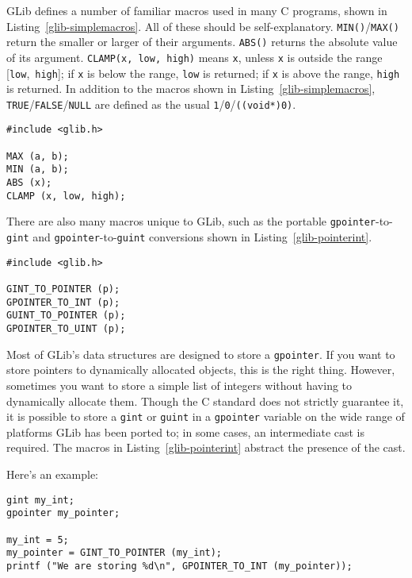 GLib defines a number of familiar macros used in many C programs, shown in Listing~\ref{glib-simplemacros}. All of these should be self-explanatory. \lstinline{MIN()}/\lstinline{MAX()} return the smaller or larger of their arguments. \lstinline{ABS()} returns the absolute value of its argument. \lstinline{CLAMP(x, low, high)} means \lstinline{x}, unless \lstinline{x} is outside the range [\lstinline{low},~\lstinline{high}]; if \lstinline{x} is below the range, \lstinline{low} is returned; if \lstinline{x} is above the range, \lstinline{high} is returned. In addition to the macros shown in Listing~\ref{glib-simplemacros}, \lstinline{TRUE}/\lstinline{FALSE}/\lstinline{NULL} are defined as the usual \lstinline{1}/\lstinline{0}/\lstinline{((void*)0)}.

\begin{lstlisting}[float, caption={Familiar C Macros}, label=glib-simplemacros]
#include <glib.h>

MAX (a, b);
MIN (a, b);
ABS (x);
CLAMP (x, low, high);
\end{lstlisting}

There are also many macros unique to GLib, such as the portable \lstinline{gpointer}-to-\lstinline{gint} and \lstinline{gpointer}-to-\lstinline{guint} conversions shown in Listing~\ref{glib-pointerint}.

\begin{lstlisting}[float, caption={Macros for storing integers in pointers}, label=glib-pointerint]
#include <glib.h>

GINT_TO_POINTER (p);
GPOINTER_TO_INT (p);
GUINT_TO_POINTER (p);
GPOINTER_TO_UINT (p);
\end{lstlisting}

Most of GLib's data structures are designed to store a \lstinline{gpointer}. If you want to store pointers to dynamically allocated objects, this is the right thing. However, sometimes you want to store a simple list of integers without having to dynamically allocate them. Though the C standard does not strictly guarantee it, it is possible to store a \lstinline{gint} or \lstinline{guint} in a \lstinline{gpointer} variable on the wide range of platforms GLib has been ported to; in some cases, an intermediate cast is required. The macros in Listing~\ref{glib-pointerint} abstract the presence of the cast.

Here's an example:
\begin{lstlisting}
gint my_int;
gpointer my_pointer;

my_int = 5;
my_pointer = GINT_TO_POINTER (my_int);
printf ("We are storing %d\n", GPOINTER_TO_INT (my_pointer));
\end{lstlisting}

